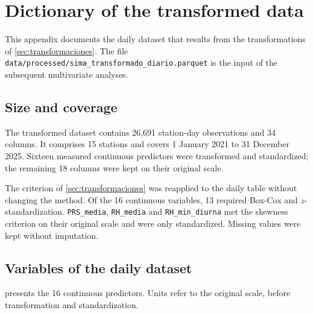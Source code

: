 \section{Dictionary of the transformed data}\label{sec:diccionario-transformado}
This appendix documents the daily dataset that results from the
transformations of \cref{sec:transformaciones}. The file
\texttt{data/processed/sima\_transformado\_diario.parquet} is the input of the
subsequent multivariate analyses.

\subsection{Size and coverage}
The transformed dataset contains 26,691 station-day observations and 34
columns. It comprises 15 stations and covers 1 January 2021 to 31 December
2025. Sixteen measured continuous predictors were transformed and
standardized; the remaining 18 columns were kept on their original scale.

The criterion of \cref{sec:transformaciones} was reapplied to the daily table
without changing the method. Of the 16 continuous variables, 13 required
Box-Cox and $z$-standardization. \texttt{PRS\_media}, \texttt{RH\_media} and
\texttt{RH\_min\_diurna} met the skewness criterion on their original scale
and were only standardized. Missing values were kept without imputation.

\subsection{Variables of the daily dataset}
 presents the 16 continuous predictors. Units
refer to the original scale, before transformation and standardization.

